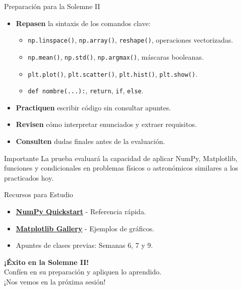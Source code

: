 \documentclass[10pt]{beamer}
\begin{document}
\begin{frame}{Preparación para la Solemne II}
  \begin{itemize}
    \item \textbf{Repasen} la sintaxis de los comandos clave:
      \begin{itemize}
        \item \texttt{np.linspace()}, \texttt{np.array()}, \texttt{reshape()}, operaciones vectorizadas.
        \item \texttt{np.mean()}, \texttt{np.std()}, \texttt{np.argmax()}, máscaras booleanas.
        \item \texttt{plt.plot()}, \texttt{plt.scatter()}, \texttt{plt.hist()}, \texttt{plt.show()}.
        \item \texttt{def nombre(...):}, \texttt{return}, \texttt{if}, \texttt{else}.
      \end{itemize}
    \item \textbf{Practiquen} escribir código sin consultar apuntes.
    \item \textbf{Revisen} cómo interpretar enunciados y extraer requisitos.
    \item \textbf{Consulten} dudas finales antes de la evaluación.
  \end{itemize}

  \begin{alertblock}{Importante}
    La prueba evaluará la capacidad de aplicar NumPy, Matplotlib, funciones y condicionales en problemas físicos o astronómicos similares a los practicados hoy.
  \end{alertblock}
\end{frame}

\begin{frame}{Recursos para Estudio}
  \begin{itemize}
    \item \href{https://numpy.org/doc/stable/user/quickstart.html}{\textbf{NumPy Quickstart}} - Referencia rápida.
    \item \href{https://matplotlib.org/stable/gallery/index.html}{\textbf{Matplotlib Gallery}} - Ejemplos de gráficos.
    \item Apuntes de clases previas: Semanas 6, 7 y 9.
  \end{itemize}

  \vspace{0.5cm}

  \begin{center}
    \Large{\textbf{¡Éxito en la Solemne II!}}
    \\
    \vspace{0.3cm}
    \normalsize
    Confíen en su preparación y apliquen lo aprendido.
    \\
    ¡Nos vemos en la próxima sesión!
  \end{center}
\end{frame}
\end{document}
